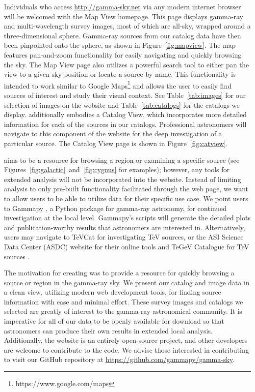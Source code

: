 Individuals who access \url{http://gamma-sky.net} via any modern internet browser will be welcomed with the Map View homepage. This page displays gamma-ray and multi-wavelength survey images, most of which are all-sky, wrapped around a three-dimensional sphere. Gamma-ray sources from our catalog data have then been pinpointed onto the sphere, as shown in Figure~\ref{fig:mapview}. The map features pan-and-zoom functionality for easily navigating and quickly browsing the sky. The Map View page also utilizes a powerful search tool to either pan the view to a given sky position or locate a source by name. This functionality is intended to work similar to Google Maps\footnote[1]{https://www.google.com/maps} and allows the user to easily find sources of interest and study their visual context. See Table~\ref{tab:images} for our selection of images on the website and Table~\ref{tab:catalogs} for the catalogs we display. \gammasky additionally embodies a Catalog View, which incorporates more detailed information for each of the sources in our catalogs. Professional astronomers will navigate to this component of the website for the deep investigation of a particular source. The Catalog View page is shown in Figure~\ref{fig:catview}.





\gammasky aims to be a resource for browsing a region or examining a specific source (see Figures~\ref{fig:galactic}~and~\ref{fig:cygnus} for examples); however, any tools for extended analysis will not be incorporated into the website. Instead of limiting analysis to only pre-built functionality facilitated through the web page, we want to allow users to be able to utilize data for their specific use case. We point users to Gammapy \cite{gammapy}, a Python package for gamma-ray astronomy, for continued investigation at the local level. Gammapy's scripts will generate the detailed plots and publication-worthy results that astronomers are interested in. Alternatively, users may navigate to TeVCat \cite{tevcat} for investigating TeV sources, or the ASI Science Data Center (ASDC) website for their online tools and TeGeV Catalogue for TeV sources \cite{tgevcat}.


The motivation for creating \gammasky was to provide a resource for quickly browsing a source or region in the gamma-ray sky. We present our catalog and image data in a clean view, utilizing modern web development tools, for finding source information with ease and minimal effort. These survey images and catalogs we selected are greatly of interest to the gamma-ray astronomical community. It is imperative for all of our data to be openly available for download so that astronomers can produce their own results in extended local analysis. Additionally, the website is an entirely open-source project, and other developers are welcome to contribute to the code. We advise those interested in contributing to visit our GitHub repository at \url{https://github.com/gammapy/gamma-sky}.
